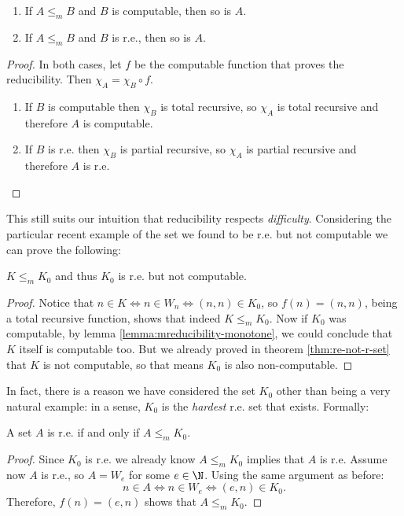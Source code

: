 \documentclass[../main.tex]{memoir}
\begin{document}
\begin{lemma}
  \label{lemma:mreducibility-monotone}
  \begin{enumerate}
  \item If $A \le_m B$ and $B$ is computable, then so is $A$.
  \item If $A \le_m B$ and $B$ is r.e., then so is $A$.
  \end{enumerate}
\end{lemma}
\begin{proof}
  In both cases, let $f$ be the computable function that proves the reducibility. Then $\chi_A = \chi_B \circ f$.
  \begin{enumerate}
  \item If $B$ is computable then $\chi_B$ is total recursive, so $\chi_A$ is total recursive and therefore $A$ is computable.
  \item If $B$ is r.e. then $\chi_B$ is partial recursive, so $\chi_A$ is partial recursive and therefore $A$ is r.e.
  \end{enumerate}
\end{proof}

This still suits our intuition that reducibility respects \textit{difficulty}. Considering the particular recent example of the set we found to be r.e. but not computable we can prove the following:

\begin{lemma}
  \label{lemma:k-m-red-k0}
  $K \le_m K_0$ and thus $K_0$ is r.e. but not computable.
\end{lemma}
\begin{proof}
  Notice that $n \in K \iff n \in W_n \iff (n, n) \in K_0$, so $f(n) = (n, n)$, being a total recursive function, shows that indeed $K \le_m K_0$. Now if $K_0$ was computable, by lemma \ref{lemma:mreducibility-monotone}, we could conclude that $K$ itself is computable too. But we already proved in theorem \ref{thm:re-not-r-set} that $K$ is not computable, so that means $K_0$ is also non-computable.
\end{proof}

In fact, there is a reason we have considered the set $K_0$ other than being a very natural example: in a sense, $K_0$ is the \textit{hardest} r.e. set that exists. Formally:

\begin{lemma}
  \label{lemma:k0-complete}
  A set $A$ is r.e. if and only if $A \le_m K_0$.
\end{lemma}
\begin{proof}
  Since $K_0$ is r.e. we already know $A \le_m K_0$ implies that $A$ is r.e. Assume now $A$ is r.e., so $A = W_e$ for some $e \in \N$. Using the same argument as before:
  \[ n \in A \iff n \in W_e \iff (e, n) \in K_0. \]
  Therefore, $f(n) = (e, n)$ shows that $A \le_m K_0$.
\end{proof}
\end{document}
